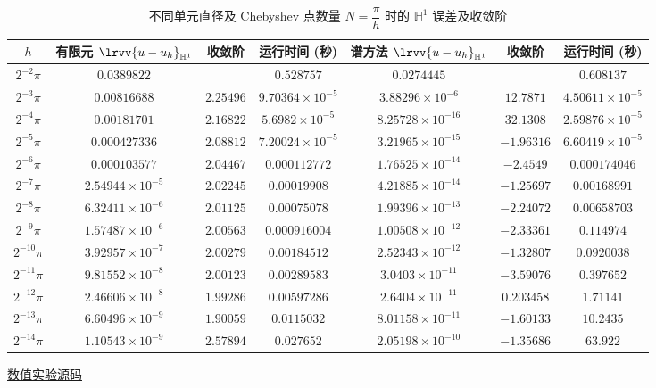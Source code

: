 \documentclass[UTF8, a4paper, 12pt, oneside, onecolumn]{article}
\begin{document}
\begin{table}[H]\centering\heiti{}
	\caption{不同单元直径及 Chebyshev 点数量 $N = \dfrac{\pi}{h}$ 时的 $\mathbb{H}^1$ 误差及收敛阶}\label{tab:1dFEMSM}
	\begin{tabular}{|c|c|c|c|c|c|c|}
		\hline
		$h$	&	有限元 $\lrvv{u - u_h}_{\mathbb{H}^1}$	&	收敛阶	&	运行时间 (秒)	&	谱方法 $\lrvv{u - u_h}_{\mathbb{H}^1}$	&	收敛阶	&	运行时间 (秒)\\\hline
		$2^{-2}\pi$	&	$0.0389822$	&		&	$0.528757$	&	$0.0274445$	&		&	$0.608137$\\\hline
		$2^{-3}\pi$	&	$0.00816688$	&	$2.25496$	&	$9.70364 \times 10^{-5}$	&	$3.88296 \times 10^{-6}$	&	$12.7871$	&	$4.50611 \times 10^{-5}$\\\hline
		$2^{-4}\pi$	&	$0.00181701$	&	$2.16822$	&	$5.6982 \times 10^{-5}$	&	$8.25728 \times 10^{-16}$	&	$32.1308$	&	$2.59876 \times 10^{-5}$\\\hline
		$2^{-5}\pi$	&	$0.000427336$	&	$2.08812$	&	$7.20024 \times 10^{-5}$	&	$3.21965 \times 10^{-15}$	&	$-1.96316$	&	$6.60419 \times 10^{-5}$\\\hline
		$2^{-6}\pi$	&	$0.000103577$	&	$2.04467$	&	$0.000112772$	&	$1.76525 \times 10^{-14}$	&	$-2.4549$	&	$0.000174046$\\\hline
		$2^{-7}\pi$	&	$2.54944 \times 10^{-5}$	&	$2.02245$	&	$0.00019908$	&	$4.21885 \times 10^{-14}$	&	$-1.25697$	&	$0.00168991$\\\hline
		$2^{-8}\pi$	&	$6.32411 \times 10^{-6}$	&	$2.01125$	&	$0.00075078$	&	$1.99396 \times 10^{-13}$	&	$-2.24072$	&	$0.00658703$\\\hline
		$2^{-9}\pi$	&	$1.57487 \times 10^{-6}$	&	$2.00563$	&	$0.000916004$	&	$1.00508 \times 10^{-12}$	&	$-2.33361$	&	$0.114974$\\\hline
		$2^{-10}\pi$	&	$3.92957 \times 10^{-7}$	&	$2.00279$	&	$0.00184512$	&	$2.52343 \times 10^{-12}$	&	$-1.32807$	&	$0.0920038$\\\hline
		$2^{-11}\pi$	&	$9.81552 \times 10^{-8}$	&	$2.00123$	&	$0.00289583$	&	$3.0403 \times 10^{-11}$	&	$-3.59076$	&	$0.397652$\\\hline
		$2^{-12}\pi$	&	$2.46606 \times 10^{-8}$	&	$1.99286$	&	$0.00597286$	&	$2.6404 \times 10^{-11}$	&	$0.203458$	&	$1.71141$\\\hline
		$2^{-13}\pi$	&	$6.60496 \times 10^{-9}$	&	$1.90059$	&	$0.0115032$	&	$8.01158 \times 10^{-11}$	&	$-1.60133$	&	$10.2435$\\\hline
		$2^{-14}\pi$	&	$1.10543 \times 10^{-9}$	&	$2.57894$	&	$0.027652$	&	$2.05198 \times 10^{-10}$	&	$-1.35686$	&	$63.922$\\\hline
	\end{tabular}
\end{table}
\restoregeometry




\begin{appendices}

\href{https://github.com/Quejiahao/NumericalSolutionOfPartialDifferentialEquations.jl}{数值实验源码}

\end{appendices}
\end{document}
